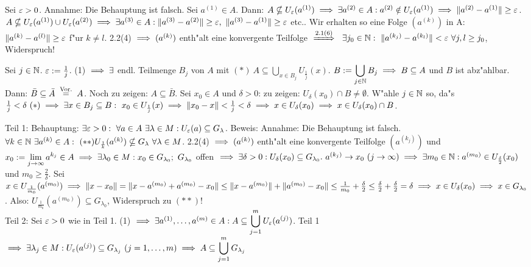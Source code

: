 \documentclass[a4paper,twoside,DIV15,BCOR12mm,chapterprefix=true,headings=twolinechapter]{scrbook}
\begin{document}
\begin{beweise}
\item Sei $\varepsilon>0$. Annahme: Die Behauptung ist falsch. Sei $a^{(1)}\in A$. Dann: $A\nsubseteq U_{\varepsilon}(a^{(1)})\implies\exists a^{(2)}\in A: a^{(2)}\notin U_\varepsilon(a^{(1)})\implies\|a^{(2)}-a^{(1)}\|\ge\varepsilon$. $A\nsubseteq U_\ep(a^{(1)})\cup U_\ep(a^{(2)})\folgt\exists a^{(3)} \in A: \|a^{(3)}-a^{(2)}\|\ge\ep,\ \|a^{(3)}-a^{(1)}\|\ge\ep$ etc.. Wir erhalten so eine Folge $(a^{(k)})$ in A: $\|a^{(k)}-a^{(l)}\|\ge\varepsilon$ f"ur $k\ne l$. 2.2(4) $\implies (a^{(k)})$ enth"alt eine konvergente Teilfolge $\folgtnach{2.1(6)}\ \exists j_0 \in\MdN:\ \|a^{(k_j)}-a^{(k_l)}\|<\ep\ \forall j,l\ge j_0$, Widerspruch!
\item Sei $j\in\mathbb{N}$. $\varepsilon:=\frac{1}{j}$. (1) $\implies\exists$ endl. Teilmenge $B_j$ von $A$ mit $(*)\ A\subseteq \displaystyle\bigcup_{x \in B_j}U_{\frac{1}{j}}(x)$. $B:=\displaystyle\bigcup_{j\in\mathbb{N}}B_j\implies B\subseteq A$ und $B$ ist abz"ahlbar. Dann: $\bar B\subseteq\bar A\gleichnach{Vor.}A$. Noch zu zeigen: $A\subseteq\bar B$. Sei $x_0\in A$ und $\delta>0$: zu zeigen: $U_\delta(x_0)\cap B\ne\emptyset$. W"ahle $j\in\mathbb{N}$ so, da"s $\frac{1}{j}<\delta\ (*)\implies\exists x \in B_j\subseteq B:\ x_0\in U_{\frac{1}{j}}(x)\implies \|x_0-x\|<\frac{1}{j}<\delta\implies x\in U_\delta(x_0)\implies x\in U_\delta(x_0)\cap B$.
\item Teil 1: Behauptung: $\exists \ep>0:\ \forall a \in A\ \exists\lambda\in M: U_\ep(a)\subseteq G_\lambda$. Beweis: Annahme: Die Behauptung ist falsch. $\forall k\in\mathbb{N}\ \exists a^{(k)}\in A:\ (**) U_{\frac{1}{k}}(a^{(k)})\nsubseteq G_\lambda\ \forall \lambda\in M$. 2.2(4) $\implies (a^{(k)})$ enth"alt eine konvergente Teilfolge $(a^{(k_j)})$ und $x_0:=\displaystyle\lim_{j\to\infty}a^{k_j}\in A\folgt\exists \lambda_0\in M: x_0 \in G_{\lambda_0};\ G_{\lambda_0}$ offen $\folgt\exists \delta>0: U_\delta(x_0)\subseteq G_{\lambda_0}.\ a^{(k_j)}\to x_0\ (j\to\infty)\folgt\exists m_0\in\MdN: a^{(m_0)}\in U_{\frac{\delta}{2}}(x_0)$ und $m_0\ge\frac{2}{\delta}$. Sei $x\in U_{\frac{1}{m_0}}(a^{(m_0)})\implies \|x-x_0\|=\|x-a^{(m_0)}+a^{(m_0)}-x_0\|\le\|x-a^{(m_0)}\|+\|a^{(m_0)}-x_0\|\le\frac{1}{m_0}+\frac{\delta}{2}\le\frac{\delta}{2}+\frac{\delta}{2}=\delta\implies x\in U_\delta(x_0)\implies x \in G_{\lambda_0}$. Also: $U_{\frac{1}{m_0}}(a^{(m_0)})\subseteq G_{\lambda_0}$, Widerspruch zu $(**)$!\\
Teil 2: Sei $\varepsilon>0$ wie in Teil 1. (1) $\implies\exists a^{(1)},\ldots,a^{(m)}\in A: A\subseteq\displaystyle\bigcup_{j=1}^mU_\varepsilon(a^{(j)})$. Teil 1 $\implies\exists \lambda_j\in M: U_\varepsilon(a^{(j)})\subseteq G_{\lambda_j}\ (j=1,\ldots,m)\implies A\subseteq \displaystyle\bigcup_{j=1}^m G_{\lambda_j}$ 
\end{beweise}
\end{document}
